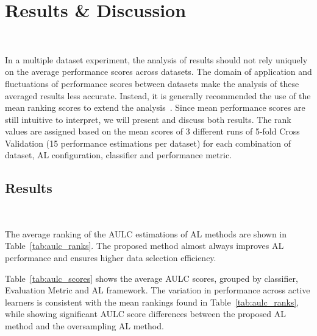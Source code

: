 \documentclass[parskip=full]{scrartcl}
\begin{document}
\section{Results \& Discussion}~\label{sec:results_discussion}

In a multiple dataset experiment, the analysis of results should not rely
uniquely on the average performance scores across datasets. The domain of
application and fluctuations of performance scores between datasets make the
analysis of these averaged results less accurate. Instead, it is generally
recommended the use of the mean ranking scores to extend the
analysis~\cite{Demsar2006}. Since mean performance scores are still intuitive
to interpret, we will present and discuss both results. The rank values are
assigned based on the mean scores of 3 different runs of 5-fold Cross
Validation (15 performance estimations per dataset) for each combination of
dataset, AL configuration, classifier and performance metric.

\subsection{Results}~\label{sec:sub_results}

The average ranking of the AULC estimations of AL methods are shown in
Table~\ref{tab:aulc_ranks}. The proposed method almost always improves AL
performance and ensures higher data selection efficiency.

\begin{table}[H]
    \centering
    \caption{%
        Mean rankings of the AULC metric over the different datasets (10),
        folds (5) and runs (3) used in the experiment. The proposed method
        always improves the results of the original framework and on average
        almost always improves the results of the oversampling framework.
    }\label{tab:aulc_ranks}
\end{table}

Table~\ref{tab:aulc_scores} shows the average AULC scores, grouped by
classifier, Evaluation Metric and AL framework. The variation in performance
across active learners is consistent with the mean rankings found in
Table~\ref{tab:aulc_ranks}, while showing significant AULC score differences
between the proposed AL method and the oversampling AL method.
\end{document}
